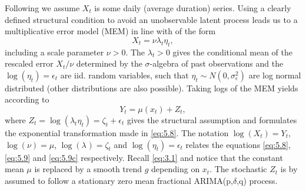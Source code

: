 \documentclass[12pt]{article}
\begin{document}
Following \textcite{beran2015efarima} we assume \(X_{t}\) is some daily (average duration) series. 
Using  a clearly defined structural condition to avoid an unobservable latent process leads us to a multiplicative error model (MEM) in line with \textcite{engle2002new} of the form 
\begin{equation}
\label{eq:5.8} X_{t} = \nu\lambda_{t}\eta_{t},
\end{equation}
including a scale parameter \(\nu > 0\).
The \(\lambda_{t} > 0\) gives the conditional mean of the rescaled error \(X_{t}/\nu\) determined by the \(\sigma\)-algebra of past observations and the \(\log(\eta_{t}) = \epsilon_{t}\) are iid. random variables, such that \(\eta_{t} \sim N(0,\sigma_{\epsilon}^{2})\) are log normal distributed (other distributions are also possible). Taking logs of the MEM yields according to \textcite{beran2014empirical}
\begin{equation}
\label{eq:5.9}
Y_{t} = \mu(x_t) + Z_{t},
\end{equation} 
where 
$
Z_{t} = \log(\lambda_{t}\eta_{t}) = \zeta_{t} + \epsilon_{t}
$
gives the structural assumption and formulates the exponential transformation made in \eqref{eq:5.8}.
The notation \(\log(X_{t}) = Y_{t} \), \(\log (\nu) = \mu\), \(\log(\lambda_{}) = \zeta_{t}\) and \(\log(\eta_{t}) = \epsilon_{t}\) relates the equations \eqref{eq:5.8}, \eqref{eq:5.9} and \eqref{eq:5.9c} respectively. 
Recall \eqref{eq:3.1} and notice that the constant mean \(\mu\) is replaced by a smooth trend \(g\) depending on \(x_t\).
The stochastic \(Z_{t}\) is by \textcite{beran2015modelling} assumed to follow a stationary zero mean fractional ARIMA(p,\( \delta \),q) process.
\end{document}
